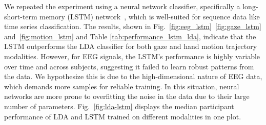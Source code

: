 \begin{comment}
        0.65 & X & 1.0 & 2.25\\
        0.70 & X & 1.25 & 2.25\\
        0.75 & X & 1.75 & 2.5 \\
        0.80 & X & 1.75 & 2.75\\
        0.85 & X & 2.25 & 2.75\\
        0.90 & X & 2.75 & X \\
        \bottomrule
    \end{tabular}
    \caption{Time (in seconds) at which different AUC-ROC levels are reached for the median performance of each modality, with LSTM. An AUC-ROC level is considered reached if it is sustained for at least three consecutive time steps; ``X" indicates the AUC-ROC level was not reached.}
    \label{tab:performance_lstm}
\end{table}
    
\end{comment}




We repeated the experiment using a neural network classifier, specifically a long-short-term memory (LSTM) network~\cite{hochreiter1997long}, which is well-suited for sequence data like time series classification. The results, shown in Fig.~\ref{fig:eeg_lstm}~\ref{fig:gaze_lstm} and~\ref{fig:motion_lstm} and Table \ref{tab:performance_lstm_lda}, indicate that the LSTM outperforms the LDA classifier for both gaze and hand motion trajectory modalities. However, for EEG signals, the LSTM's performance is highly variable over time and across subjects, suggesting it failed to learn robust patterns from the data. We hypothesize this is due to the high-dimensional nature of EEG data, which demands more samples for reliable training. In this situation, neural networks are more prone to overfitting the noise in the data due to their large number of parameters. Fig.~\ref{fig:lda-lstm} displays the median participant performance of LDA and LSTM trained on different modalities in one plot.


